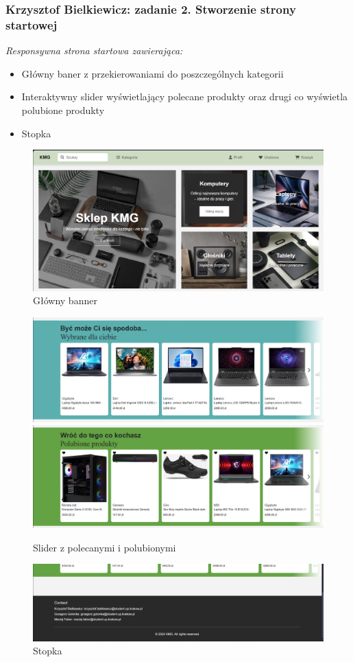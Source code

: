 \documentclass[12pt,a4paper,oneside]{article}
\theoremstyle{definition}
\numberwithin{equation}{section}
\begin{document}
\subsubsection{Krzysztof Bielkiewicz: zadanie 2. Stworzenie strony startowej}
\label{1.3.2}
\textit{Responsywna strona startowa zawierająca:}
    \begin{itemize}
        \item Główny baner z przekierowaniami do poszczególnych kategorii
        \item Interaktywny slider wyświetlający polecane produkty oraz drugi co wyświetla polubione produkty
        \item Stopka
    \end{itemize}
    \begin{figure}[H]
        \centering
        \includegraphics[width=0.8\columnwidth]{images/krzysztofBImages/main-banner.png}
        \caption{Główny banner}
        \label{main-banner}
    \end{figure}
    \begin{figure}[H]
        \centering
        \includegraphics[width=0.8\columnwidth]{images/krzysztofBImages/slider-polecane.png}
        \includegraphics[width=0.8\columnwidth]{images/krzysztofBImages/slider-ulubione.png}
        \caption{Slider z polecanymi i polubionymi}
        \label{Slider}
    \end{figure}
    \begin{figure}[H]
        \centering
        \includegraphics[width=0.8\columnwidth]{images/krzysztofBImages/footer.png}
        \caption{Stopka}
        \label{Stopka}
    \end{figure}
\end{document}
